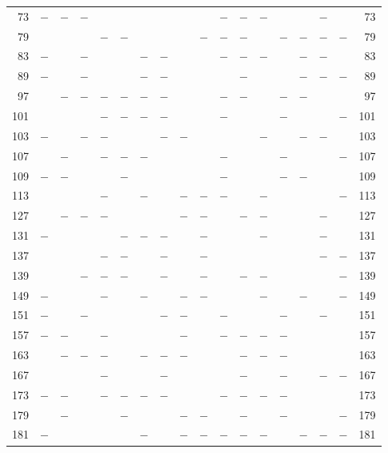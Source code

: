 \begin{center}
\begin{tabular}{r|c|c|c|c|c|c|c|c|c|c|c|c|c|c|c|c|r}
73 & $-$ & $-$ & $-$ &  &  &  &  &  &  & $-$ & $-$ & $-$ &  &  & $-$ &  & 73\\
79 &  &  &  & $-$ & $-$ &  &  &  & $-$ & $-$ & $-$ &  & $-$ & $-$ & $-$ & $-$ & 79\\
83 & $-$ &  & $-$ &  &  & $-$ & $-$ &  &  & $-$ & $-$ & $-$ &  & $-$ & $-$ &  & 83\\
89 & $-$ &  & $-$ &  &  & $-$ & $-$ &  &  &  & $-$ &  &  & $-$ & $-$ & $-$ & 89\\
97 &  & $-$ & $-$ & $-$ & $-$ & $-$ & $-$ &  &  & $-$ & $-$ &  & $-$ & $-$ &  &  & 97\\
101 &  &  &  & $-$ & $-$ & $-$ & $-$ &  &  & $-$ &  &  & $-$ &  &  & $-$ & 101\\
103 & $-$ &  & $-$ & $-$ &  &  & $-$ & $-$ &  &  &  & $-$ &  & $-$ & $-$ &  & 103\\
107 &  & $-$ &  & $-$ & $-$ & $-$ &  &  &  & $-$ &  &  & $-$ &  &  & $-$ & 107\\
109 & $-$ & $-$ &  &  & $-$ &  &  &  &  & $-$ &  &  & $-$ & $-$ &  &  & 109\\
113 &  &  &  & $-$ &  & $-$ &  & $-$ & $-$ & $-$ &  & $-$ &  &  &  & $-$ & 113\\
127 &  & $-$ & $-$ & $-$ &  &  &  & $-$ & $-$ &  & $-$ & $-$ &  &  & $-$ &  & 127\\
131 & $-$ &  &  &  & $-$ & $-$ & $-$ &  & $-$ &  &  & $-$ &  &  & $-$ &  & 131\\
137 &  &  &  & $-$ & $-$ &  & $-$ &  & $-$ &  &  &  &  &  & $-$ & $-$ & 137\\
139 &  &  & $-$ & $-$ & $-$ &  & $-$ &  & $-$ &  & $-$ & $-$ &  &  &  & $-$ & 139\\
149 & $-$ &  &  & $-$ &  & $-$ &  & $-$ & $-$ &  &  & $-$ &  & $-$ &  & $-$ & 149\\
151 & $-$ &  & $-$ &  &  &  & $-$ & $-$ &  & $-$ &  &  & $-$ &  & $-$ &  & 151\\
157 & $-$ & $-$ &  & $-$ &  &  &  & $-$ &  & $-$ & $-$ & $-$ & $-$ &  &  &  & 157\\
163 &  & $-$ & $-$ & $-$ &  & $-$ & $-$ & $-$ &  &  & $-$ & $-$ & $-$ &  &  &  & 163\\
167 &  &  &  & $-$ &  &  & $-$ &  &  &  & $-$ &  & $-$ &  & $-$ & $-$ & 167\\
173 & $-$ & $-$ &  & $-$ & $-$ & $-$ & $-$ &  &  & $-$ & $-$ & $-$ & $-$ &  &  &  & 173\\
179 &  & $-$ &  &  & $-$ &  &  & $-$ & $-$ &  & $-$ &  & $-$ &  &  & $-$ & 179\\
181 & $-$ &  &  &  &  & $-$ &  & $-$ & $-$ & $-$ & $-$ & $-$ &  & $-$ & $-$ & $-$ & 181\\

\end{tabular}
\end{center}
